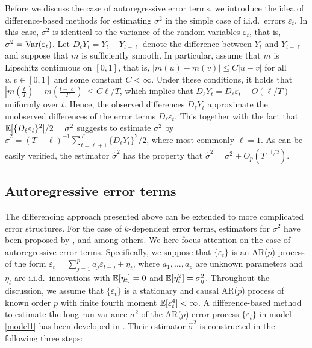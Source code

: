 Before we discuss the case of autoregressive error terms, we introduce the idea of difference-based methods for estimating $\sigma^2$ in the simple case of i.i.d.\ errors $\varepsilon_t$. In this case, $\sigma^2$ is identical to the variance of the random variables $\varepsilon_t$, that is, $\sigma^2 = \textnormal{Var}(\varepsilon_t)$. Let $D_\ell Y_t = Y_t - Y_{t-\ell}$ denote the difference between $Y_t$ and $Y_{t-\ell}$ and suppose that $m$ is sufficiently smooth. In particular, assume that $m$ is Lipschitz continuous on $[0,1]$, that is, $|m(u) - m(v)| \le C|u - v|$ for all $u,v \in [0,1]$ and some constant $C < \infty$. Under these conditions, it holds that $|m(\frac{t}{T}) - m(\frac{t-\ell}{T})| \le C \ell/T$, which implies that $D_\ell Y_t = D_\ell \varepsilon_t + O(\ell/T)$ uniformly over $t$. Hence, the observed differences $D_\ell Y_t$ approximate the unobserved differences of the error terms $D_\ell \varepsilon_t$. This together with the fact that $\mathbb{E}[ \{D_\ell \varepsilon_t\}^2]/2 = \sigma^2$ suggests to estimate $\sigma^2$ by $\widehat{\sigma}^2 = (T-\ell)^{-1} \sum\nolimits_{t=\ell+1}^T \{ D_\ell Y_t \}^2 / 2$, where most commonly $\ell = 1$. As can be easily verified, the estimator $\widehat{\sigma}^2$ has the property that $\widehat{\sigma}^2 = \sigma^2 + O_p(T^{-1/2})$. 


\subsection{Autoregressive error terms}\label{subsec-error-var-ar}


The differencing approach presented above can be extended to more complicated error structures. For the case of $k$-dependent error terms, estimators for $\sigma^2$ have been proposed by \cite{MuellerStadtmueller1988}, \cite{Herrmann1992} and \cite{Munk2017} among others. We here focus attention on the case of autoregressive error terms. Specifically, we suppose that $\{\varepsilon_t\}$ is an AR($p$) process of the form $\varepsilon_t = \sum_{j=1}^p a_j \varepsilon_{t-j} + \eta_t$, where $a_1,\ldots,a_p$ are unknown parameters and $\eta_t$ are i.i.d.\ innovations with $\mathbb{E}[\eta_t] = 0$ and $\mathbb{E}[\eta_t^2] = \sigma_\eta^2$. Throughout the discussion, we assume that $\{\varepsilon_t\}$ is a stationary and causal AR($p$) process of known order $p$ with finite fourth moment $\mathbb{E}[\varepsilon_t^4] < \infty$. A difference-based method to estimate the long-run variance $\sigma^2$ of the AR($p$) error process $\{\varepsilon_t\}$ in model \eqref{model1} has been developed in \cite{Hall2003}. Their estimator $\widehat{\sigma}^2$ is constructed in the following three steps: 
\vspace{10pt}



